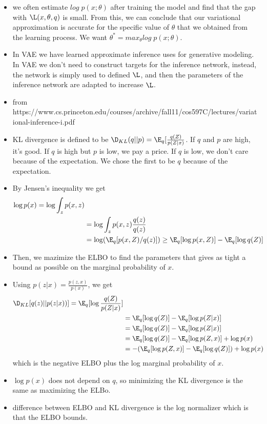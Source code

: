 \begin{itemize}
    \item we often estimate $log \; p(x;\theta)$ after training the model and find that the gap with $\L(x,\theta, q)$ is small. From this, we can conclude that our variational approximation is accurate for the specific value of $\theta$ that we obtained from the learning process. We want $\theta^* = max_{\theta}log \; p(x;\theta)$. 
    \item In VAE we have learned approximate inference uses for generative modeling. In VAE we don't need to construct targets for the inference network, instead, the network is simply used to defined $\L$, and then the parameters of the inference network are adapted to increase $\L$.
\end{itemize}
\begin{itemize}
    \item from https://www.cs.princeton.edu/courses/archive/fall11/cos597C/lectures/variational-inference-i.pdf
    \item KL divergence is defined to be $\D_{KL}(q||p) = \E_q[\frac{q(Z)}{p(Z|x)}$. If $q$ and $p$ are high, it's good. If $q$ is high but $p$ is low, we pay a price. If $q$ is low, we don't care because of the expectation. We chose the first to be $q$ because of the expectation. 
    \item By Jensen's inequality we get
    \begin{align}
        \log p(x) = \log \int_z p(x,z) \\
        &= \log \int_z p(x,z)\frac{q(z)}{q(z)} \\
        &= \log (\E_q[p(x,Z)/q(z)]) \geq \E_q[\log p(x,Z)]- \E_q[\log q(Z)]
    \end{align}
    \item Then, we mazimize the ELBO to find the parameters that gives as tight a bound as possible on the marginal probability of $x$. \item Using $p(z|x) = \frac{p(z,x)}{p(x)}$, we get
    \begin{align}
        \D_{KL}[q(z)||p(z|x))] = \E_q[\log \frac{q(Z)}{p(Z|x)}] \\
        &= \E_q[\log q(Z)] - \E_q[\log p(Z|x)] \\
        &= \E_q[\log q(Z)] - \E_q[\log p(Z|x)] \\
        &= \E_q[\log q(Z)] - \E_q[\log p(Z,x)] + \log p(x) \\
        &= -(\E_q[\log p(Z,x)]- \E_q[\log q(Z)]) + \log p(x)
    \end{align}
    which is the negative ELBO plus the log marginal probability of $x$.
    \item $\log p(x)$ does not depend on $q$, so minimizing the KL divergence is the same as maximizing the ELBo.
    \item difference  between ELBO and KL divergence is the log normalizer which is that the ELBO bounds.
\end{itemize}

